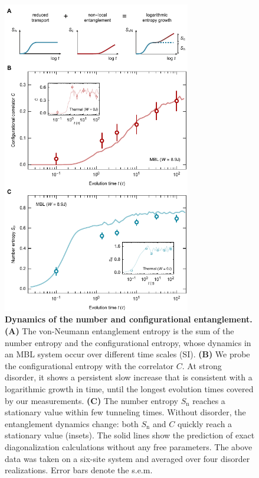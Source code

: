 \begin{figure}[t]
	\centering
	\includegraphics[width=82mm]{figures/MBL_entropy_dynamics.pdf}
	\caption{{\bf Dynamics of the number and configurational entanglement. (A)} The von-Neumann entanglement entropy is the sum of the number entropy and the configurational entropy, whose dynamics in an MBL system occur over different time scales (SI). {\bf (B)} We probe the configurational entropy with the correlator $C$. At strong disorder, it shows a persistent slow increase that is consistent with a logarithmic growth in time, until the longest evolution times covered by our measurements. {\bf (C)} The number entropy $S_\text{n}$ reaches a stationary value within few tunneling times. Without disorder, the entanglement dynamics change: both $S_\text{n}$ and $C$ quickly reach a stationary value (insets). The solid lines show the prediction of exact diagonalization calculations without any free parameters. The above data was taken on a six-site system and averaged over four disorder realizations. Error bars denote the s.e.m.}\label{fig:correlations}
\end{figure}

